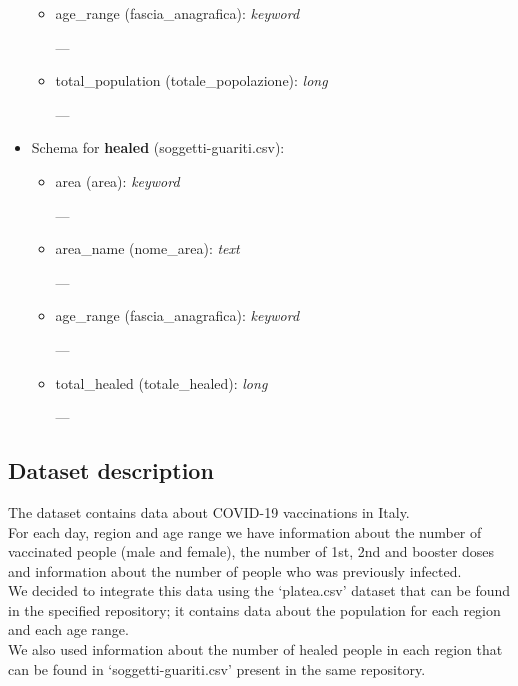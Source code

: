 \documentclass[12pt, a4paper]{article}
\begin{document}
\begin{itemize}
\begin{itemize}
            \item age\_range (fascia\_anagrafica): \emph{keyword} \\
                \begin{footnotesize}
                    ---
                \end{footnotesize}
            \item total\_population (totale\_popolazione): \emph{long} \\
                \begin{footnotesize}
                    ---
                \end{footnotesize}
        \end{itemize}
    \item Schema for \textbf{healed} (soggetti-guariti.csv):
    \begin{itemize}
        \item area (area): \emph{keyword} \\
            \begin{footnotesize}
                ---
            \end{footnotesize}
        \item area\_name (nome\_area): \emph{text} \\
            \begin{footnotesize}
                ---
            \end{footnotesize}
        \item age\_range (fascia\_anagrafica): \emph{keyword} \\
            \begin{footnotesize}
                ---
            \end{footnotesize}
        \item total\_healed (totale\_healed): \emph{long} \\
            \begin{footnotesize}
                ---
            \end{footnotesize}
    \end{itemize}
\end{itemize}

\blindtext

\subsection{Dataset description}

The dataset contains data about COVID-19 vaccinations in Italy. \\
For each day, region and age range we have information about the number of vaccinated 
people (male and female), the number of 1st, 2nd and booster doses and information 
about the number of people who was previously infected. \\
We decided to integrate this data using the ‘platea.csv’ dataset that can be found 
in the specified repository; it contains data about the population for each region 
and each age range. \\ 
We also used information about the number of healed people in each region that can be 
found in ‘soggetti-guariti.csv’ present in the same repository.
\end{document}
